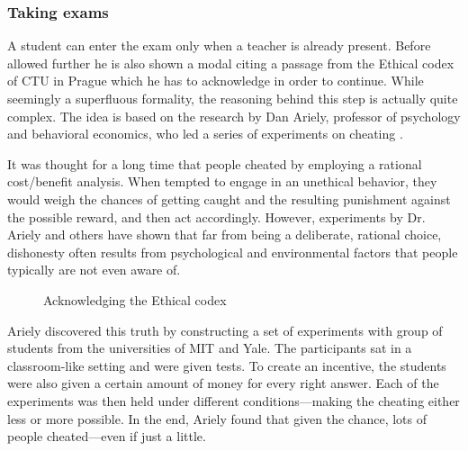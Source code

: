 \documentclass[thesis=M,english,hidelinks]{FITthesis}[2012/10/20]
\begin{document}
      \subsubsection{Taking exams}

A student can enter the exam only when a teacher is already present. Before allowed further he is also shown a modal citing a passage from the Ethical codex of CTU in Prague which he has to acknowledge in order to continue. While seemingly a superfluous formality, the reasoning behind this step is actually quite complex. The idea is based on the research by Dan Ariely, professor of psychology and behavioral economics, who led a series of experiments on cheating \cite{ariely}.

It was thought for a long time that people cheated by employing a rational cost/benefit analysis. When tempted to engage in an unethical behavior, they would weigh the chances of getting caught and the resulting punishment against the possible reward, and then act accordingly. However, experiments by Dr. Ariely and others have shown that far from being a deliberate, rational choice, dishonesty often results from psychological and environmental factors that people typically are not even aware of.

\begin{figure}
  \setlength\fboxsep{0pt}
  \setlength\fboxrule{0.2pt}
  \caption{Acknowledging the Ethical codex}
  \label{fig:ethical-codex}
\end{figure}

Ariely discovered this truth by constructing a set of experiments with group of students from the universities of MIT and Yale. The participants sat in a classroom-like setting and were given tests. To create an incentive, the students were also given a certain amount of money for every right answer. Each of the experiments was then held under different conditions---making the cheating either less or more possible. In the end, Ariely found that given the chance, lots of people cheated---even if just a little.
\end{document}
